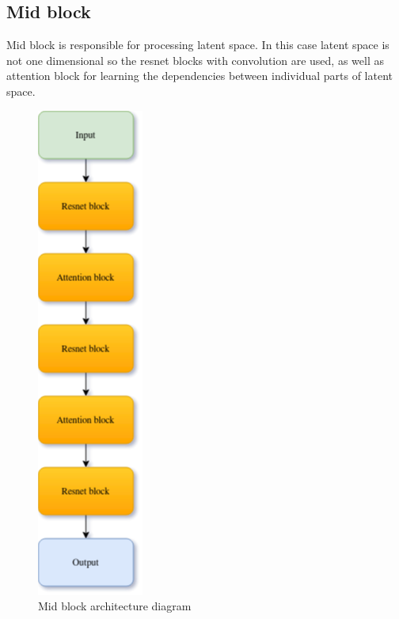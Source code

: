 \documentclass[11pt,a4paper]{report}
\begin{document}
\subsection{Mid block}
Mid block is responsible for processing latent space. In this case latent space is not one dimensional so the resnet blocks with convolution are used, as well as attention block for learning the dependencies between individual parts of latent space.
\begin{figure}[H]
	\centering
	\includegraphics[scale=0.6]{images/MidBlock.drawio}
    \caption{Mid block architecture diagram}
\end{figure}
\end{document}
